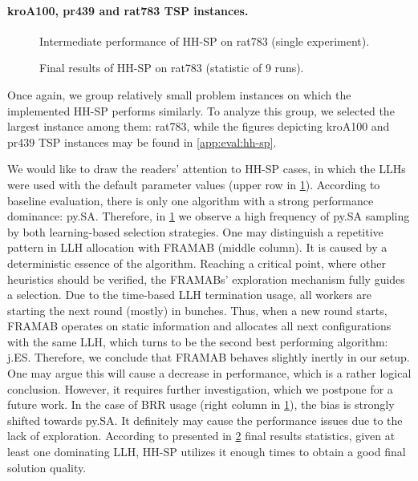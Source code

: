 \paragraph{kroA100, pr439 and rat783 TSP instances.}
\begin{figure}[t]
	\centering
	\vspace{-20pt}
	
	\caption{Intermediate performance of HH-SP on rat783 (single experiment).}
	\vspace{-5pt}
	\label{eval:pict:hh-sp:rat783 intermediate}
\end{figure}
\begin{figure}[b]
	\centering
	\vspace{-20pt}
	
	\caption{Final results of HH-SP on rat783 (statistic of 9 runs).}
	\vspace{-5pt}
	\label{eval:pict:hh-sp:rat783 final}
\end{figure}
Once again, we group relatively small problem instances on which the implemented HH-SP performs similarly. To analyze this group, we selected the largest instance among them: rat783, while the figures depicting kroA100 and pr439 TSP instances may be found in \cref{app:eval:hh-sp}.

We would like to draw the readers' attention to HH-SP cases, in which the LLHs were used with the default parameter values (upper row in \cref{eval:pict:hh-sp:rat783 intermediate}). According to baseline evaluation, there is only one algorithm with a strong performance dominance: py.SA. Therefore, in \cref{eval:pict:hh-sp:rat783 intermediate} we observe a high frequency of py.SA sampling by both learning-based selection strategies. One may distinguish a repetitive pattern in LLH allocation with FRAMAB (middle column). It is caused by a deterministic essence of the algorithm. Reaching a critical point, where other heuristics should be verified, the FRAMABs' exploration mechanism fully guides a selection. Due to the time-based LLH termination usage, all workers are starting the next round (mostly) in bunches. Thus, when a new round starts, FRAMAB operates on static information and allocates all next configurations with the same LLH, which turns to be the second best performing algorithm: j.ES. Therefore, we conclude that FRAMAB behaves slightly inertly in our setup. One may argue this will cause a decrease in performance, which is a rather logical conclusion. However, it requires further investigation, which we postpone for a future work. In the case of BRR usage (right column in \cref{eval:pict:hh-sp:rat783 intermediate}), the bias is strongly shifted towards py.SA. It definitely may cause the performance issues due to the lack of exploration. According to presented in \cref{eval:pict:hh-sp:rat783 final} final results statistics, given at least one dominating LLH, HH-SP utilizes it enough times to obtain a good final solution quality.

